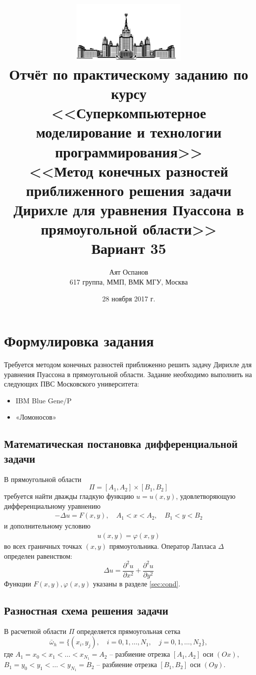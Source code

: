 \documentclass[12pt, a4paper]{article}
\title{
    \includegraphics[height=3cm]{pics/msu.png} \\
    \normalsize{
        Отчёт по практическому заданию по курсу \\
        <<Суперкомпьютерное моделирование и технологии программирования>> \\
    }
    \large{
        \textbf{<<Метод конечных разностей приближенного решения задачи Дирихле для уравнения Пуассона в прямоугольной области>>}\\
        Вариант 35
    }
}
\author{
    \normalsize{Аят Оспанов} \\
    \normalsize{617 группа, ММП, ВМК МГУ, Москва}
}
\date{\normalsize{28 ноября 2017 г.}}
\begin{document}
    \maketitle
    \tableofcontents

    \section{Формулировка задания}
        Требуется методом конечных разностей приближенно решить задачу Дирихле для
        уравнения Пуассона в прямоугольной области. Задание необходимо выполнить на
        следующих ПВС Московского университета:
        \begin{itemize}[leftmargin=1.5cm]
            \item IBM Blue Gene/P
            \item «Ломоносов»
        \end{itemize}

        \subsection{Математическая постановка дифференциальной задачи}
            В прямоугольной области
                $$\Pi = [A_1, A_2] \times [B_1, B_2]$$
            требуется найти дважды гладкую функцию $u = u(x, y)$, удовлетворяющую
            дифференциальному уравнению
            \begin{gather}
                -\Delta u = F(x, y), \quad A_1 < x < A_2, \quad B_1 < y < B_2
                \label{eq:1}
            \end{gather}
            и дополнительному условию
            \begin{gather}
                u(x, y) = \varphi(x, y)
                \label{eq:2}
            \end{gather}
            во всех граничных точках $(x, y)$ прямоугольника. Оператор Лапласа $\Delta$
            определен равенством:
                $$\Delta u = \frac{\partial^2 u}{\partial x^2} + \frac{\partial^2 u}{\partial y^2}$$
            Функции $F(x, y), \varphi(x, y)$ указаны в разделе \ref{sec:cond}.

        \subsection{Разностная схема решения задачи}
            В расчетной области $\Pi$ определяется прямоугольная сетка
                $$\bar\omega_h = \{(x_i, y_j), \quad i = 0, 1, \dots, N_1, \quad j = 0, 1, \dots, N_2\},$$
            где $A_1 = x_0 < x_1 < \dots < x_{N_1} = A_2$ -- разбиение отрезка $[A_1, A_2]$ оси $(Ox)$,\\$B_1 = y_0 < y_1 < \dots < y_{N_1} = B_2$ -- разбиение отрезка $[B_1, B_2]$ оси $(Oy)$.
\end{document}
